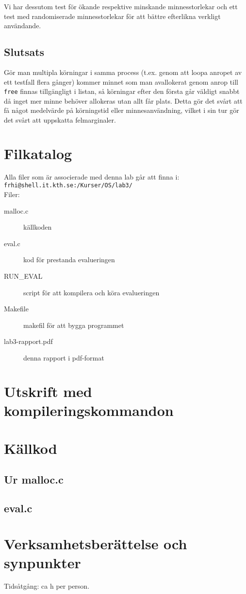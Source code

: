 \documentclass[a4paper]{article}
\begin{document}
Vi har dessutom test för ökande respektive minskande minnesstorlekar och ett test med randomiserade minnesstorlekar för att bättre efterlikna verkligt användande.

\subsection*{Slutsats}
Gör man multipla körningar i samma process (t.ex. genom att loopa anropet av ett testfall flera gånger) kommer minnet som man avallokerat genom anrop till \texttt{free} finnas tillgängligt i listan, så körningar efter den första går väldigt snabbt då inget mer minne behöver allokeras utan allt får plats.
Detta gör det svårt att få något medelvärde på körningstid eller minnesanvändning, vilket i sin tur gör det svårt att uppskatta felmarginaler.

\section*{Filkatalog}
Alla filer som är associerade med denna lab går att finna i:\\
\texttt{frhi@shell.it.kth.se:/Kurser/OS/lab3/}
\\
Filer:
\begin{description}
\item[malloc.c] källkoden
\item[eval.c] kod för prestanda evalueringen
\item[RUN\_EVAL] script för att kompilera och köra evalueringen
\item[Makefile] makefil för att bygga programmet
\item[lab3-rapport.pdf] denna rapport i pdf-format
\end{description}

\section*{Utskrift med kompileringskommandon}
%

\section*{Källkod}
\subsection*{Ur malloc.c}


\subsection*{eval.c}


\section*{Verksamhetsberättelse och synpunkter}
Tidsåtgång: ca h per person.
\end{document}
